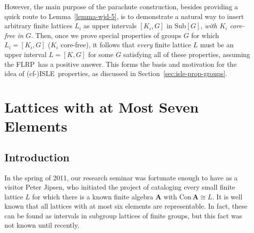 \documentclass[cm,dissertation]{uhthesis}
\theoremstyle{plain}
\theoremstyle{definition}
\theoremstyle{remark}
\numberwithin{theorem}{section}
\numberwithin{claim}{chapter}
\numberwithin{equation}{section}
\numberwithin{conjecture}{chapter}
\newcommand{\<}{\ensuremath{\langle}}
\renewcommand{\>}{\ensuremath{\rangle}}
\newcommand{\Con}{\ensuremath{\mathrm{Con\,}}}
\newcommand{\Sub}{\ensuremath{\mathrm{Sub}}}
\newcommand{\FLRP}{{\small FLRP}}
\newcommand{\0}{\ensuremath{\mathbf{0}}}
\newcommand{\1}{\ensuremath{\mathbf{1}}}
\newcommand{\2}{\ensuremath{\mathbf{2}}}
\newcommand{\3}{\ensuremath{\mathbf{3}}}
\newcommand{\4}{\ensuremath{\mathbf{4}}}
\newcommand{\5}{\ensuremath{\mathbf{5}}}
\newcommand{\bA}{\ensuremath{\mathbf{A}}}
\newcommand{\ISLE}{{\small ISLE}}
\begin{document}
However, the main purpose of the parachute construction, besides providing
a quick route to Lemma~\ref{lemma-wjd-5},
is to demonstrate a natural way to insert arbitrary finite lattices $L_i$ as
upper intervals $[K_i, G]$ in $\Sub[G]$, {\it with $K_i$ core-free in $G$}.
Then, once we prove special properties of
groups $G$ for which $L_i = [K_i, G]$ ($K_i$ core-free), 
it follows that \emph{every} finite lattice $L$ must be an upper
interval $L = [K, G]$ for some $G$ satisfying all of these properties,
assuming the \FLRP\ has a positive answer.  This forms the basis and motivation 
for the idea of (cf-)\ISLE\ properties, as discussed in
Section~\ref{sec:isle-prop-groups}. 

\chapter{Lattices with at Most Seven Elements}
\label{cha:lattices-with-at}
\section{Introduction}
In the spring of 2011, our research seminar was fortunate enough to have 
as a visitor 
%
Peter Jipsen, who initiated the project of cataloging
every small finite lattice $L$ for which there is a known finite algebra 
$\bA$ with $\Con\bA\cong L$. 
It is well known that all lattices with at most six elements are representable.
In fact, these can be found as intervals in subgroup lattices of finite groups,
but this fact was not known until recently.  
\end{document}
